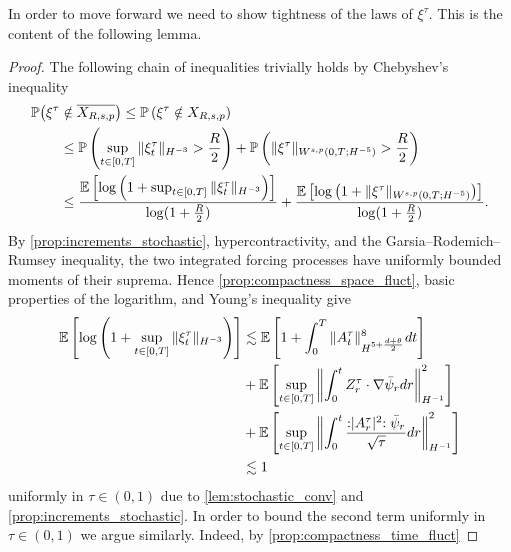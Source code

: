 \documentclass[a4paper,10pt]{amsart}
\renewcommand{\epsilon}{\varepsilon}
\newcommand{\norm}[1]{\left\|#1\right\|}
\newcommand{\wick}[1]{:\mathrel{#1}:}
\newcommand{\expt}[1]{\mathbb{E}\left[#1\right]}
\newtheorem{lemma}[theorem]{Lemma}
\theoremstyle{remark}
\numberwithin{equation}{section}
\begin{document}
In order to move forward we need to show tightness of the laws of $\xi^{\tau}.$ This is the content of the following lemma.
\begin{proof}
    The following chain of inequalities trivially holds by Chebyshev’s inequality
    \begin{align}\label{tightness_0_fluct}
        \mathbb{P}\big(\xi^{\tau}&\notin \overline{X_{R,s,p}}\big)\leq \mathbb{P}\left(\xi^{\tau}\notin {X_{R,s,p}}\right)\notag\\ & \leq \mathbb{P}\left(\sup_{t\in [0,T]}\|\xi^{\tau}_t\|_{H^{-3}}>\frac{R}{2} \right)+\mathbb{P}\left(\|\xi^{\tau}\|_{W^{s,p}(0,T;H^{-5})}>\frac{R}{2} \right)\notag\\ & \leq \frac{\expt{\log\left(1+\sup_{t\in [0,T]}\|\xi^{\tau}_t\|_{H^{-3}}\right)}}{\log(1+\frac{R}{2})} + \frac{\expt{\log\left(1+\|\xi^{\tau}\|_{W^{s,p}(0,T;H^{-5})}\right)}}{\log(1+\frac{R}{2})}.
    \end{align}
    By \cref{prop:increments_stochastic}, hypercontractivity, and the
    Garsia--Rodemich--Rumsey inequality, the two integrated forcing processes
    have uniformly bounded moments of their suprema. Hence
    \cref{prop:compactness_space_fluct}, basic properties of the logarithm,
    and Young's inequality give
    \begin{align}\label{tightness_1_fluct}
        \expt{\log\left(1+\sup_{t\in [0,T]}\|\xi^{\tau}_t\|_{H^{-3}}\right)}& \lesssim\expt{1+\int_0^T\|A^\tau_t\|^8_{H^{5+\frac{d+\theta}{2}}}dt}\notag\\ & +\expt{\sup_{t\in [0,T]}\norm{\int_0^t Z^{\tau}_r\cdot\nabla\bar{\psi}_r dr}_{H^{-1}}^2}\notag\\ &+\expt{\sup_{t\in [0,T]}\norm{\int_0^t \frac{\wick{|A^\tau_r|^2}\bar{\psi}_r}{\sqrt{\tau}} dr}^2_{H^{-1}}}
        \notag\\ & \lesssim 1 
    \end{align}
    uniformly in $\tau\in (0,1)$ due to \cref{lem:stochastic_conv} and \cref{prop:increments_stochastic}. In order to bound the second term uniformly in $\tau\in (0,1)$ we argue similarly. Indeed, by \cref{prop:compactness_time_fluct} 

\end{proof}
\end{document}
